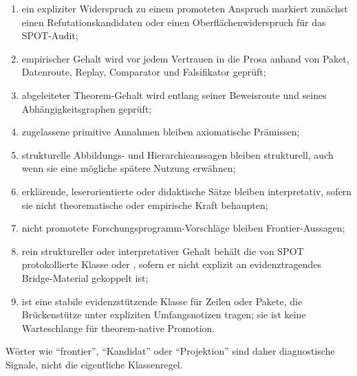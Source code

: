 \begin{enumerate}
\item ein expliziter Widerspruch zu einem promoteten Anspruch markiert
      zunächst einen Refutationskandidaten oder einen Oberflächenwiderspruch
      für das SPOT-Audit;
\item empirischer Gehalt wird vor jedem Vertrauen in die Prosa anhand von
      Paket, Datenroute, Replay, Comparator und Falsifikator geprüft;
\item abgeleiteter Theorem-Gehalt wird entlang seiner Beweisroute und seines
      Abhängigkeitsgraphen geprüft;
\item zugelassene primitive Annahmen bleiben axiomatische Prämissen;
\item strukturelle Abbildungs- und Hierarchieaussagen bleiben strukturell,
      auch wenn sie eine mögliche spätere Nutzung erwähnen;
\item erklärende, leserorientierte oder didaktische Sätze bleiben interpretativ,
      sofern sie nicht theorematische oder empirische Kraft behaupten;
\item nicht promotete Forschungsprogramm-Vorschläge bleiben Frontier-Aussagen;
\item rein struktureller oder interpretativer Gehalt behält die von SPOT
      protokollierte Klasse  oder ,
      sofern er nicht explizit an evidenztragendes Bridge-Material gekoppelt ist;
\item {} ist eine stabile evidenzstützende Klasse für Zeilen
      oder Pakete, die Brückenstütze unter expliziten Umfangsnotizen tragen;
      sie ist keine Warteschlange für theorem-native Promotion.
\end{enumerate}
Wörter wie ``frontier'', ``Kandidat'' oder ``Projektion'' sind daher
diagnostische Signale, nicht die eigentliche Klassenregel.

